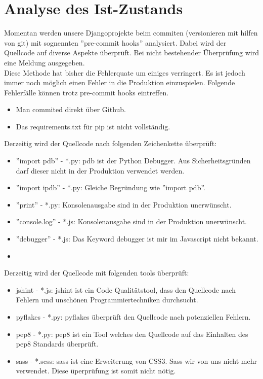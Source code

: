 \section{Analyse des Ist-Zustands}
Momentan werden unsere Djangoprojekte beim commiten (versionieren mit hilfen von git) mit sognennten ''pre-commit hooks'' analysiert. 
Dabei wird der Quellcode auf diverse Aspekte überprüft. Bei nicht bestehender Überprüfung wird eine Meldung ausgegeben.\\
Diese Methode hat bisher die Fehlerquate um einiges verringert. Es ist jedoch immer noch möglich einen Fehler in die Produktion einzuspielen.  
Folgende Fehlerfälle können trotz pre-commit hooks eintreffen. 
\begin{itemize}
    \item Man commited direkt über Github.
    \item Das requirements.txt für pip ist nicht vollständig.
\end{itemize}
Derzeitig wird der Quellcode nach folgenden Zeichenkette überprüft:
\begin{itemize}
    \item ''import pdb'' - *.py: 
        pdb ist der Python Debugger. Aus Sicherheitsgründen darf dieser nicht in der Produktion verwendet werden.
    \item ''import ipdb'' - *.py:
        Gleiche Begründung wie ''import pdb''.
    \item ''print'' - *.py:
        Konsolenausgabe sind in der Produktion unerwünscht.
    \item ''console.log'' - *.js:
        Konsolenausgabe sind in der Produktion unerwünscht.
    \item ''debugger'' - *.js:
        Das Keyword debugger ist mir im Javascript nicht bekannt.
    \item 
\end{itemize}
Derzeitig wird der Quellcode mit folgenden tools überprüft:
\begin{itemize}
    \item jshint - *.js:
        jshint ist ein Code Qualitätstool, dass den Quellcode nach Fehlern und unschönen Programmiertechniken durchsucht.
    \item pyflakes - *.py:
        pyflakes überprüft den Quellcode nach potenziellen Fehlern.
    \item pep8 - *.py:
        pep8 ist ein Tool welches den Quellcode auf das Einhalten des pep8 Standards überprüft.
    \item sass - *.scss:
       sass ist eine Erweiterung von CSS3. Sass wir von uns nicht mehr verwendet. Diese üperprüfung ist somit nicht nötig. 
\end{itemize}


